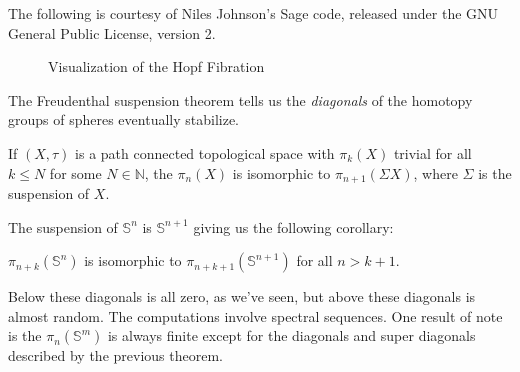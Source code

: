 \documentclass{beamer}
\begin{document}
    \begin{frame}
        The following is courtesy of Niles Johnson's Sage code, released under
        the GNU General Public License, version 2.
        \begin{figure}
            \caption{Visualization of the Hopf Fibration}
            \label{fig:hopf_fibration}
        \end{figure}
    \end{frame}
    \begin{frame}
        The Freudenthal suspension theorem tells us the \textit{diagonals} of
        the homotopy groups of spheres eventually stabilize.
        \begin{theorem}
            If $(X,\tau)$ is a path connected topological space with
            $\pi_{k}(X)$ trivial for all $k\leq{N}$ for some $N\in\mathbb{N}$,
            the $\pi_{n}(X)$ is isomorphic to
            $\pi_{n+1}(\Sigma{X})$, where $\Sigma$ is the suspension of $X$.
        \end{theorem}
        The suspension of $\mathbb{S}^{n}$ is $\mathbb{S}^{n+1}$ giving us the
        following corollary:
        \begin{theorem}
            $\pi_{n+k}(\mathbb{S}^{n})$ is isomorphic to
            $\pi_{n+k+1}(\mathbb{S}^{n+1})$ for all $n>k+1$.
        \end{theorem}
        Below these diagonals is all zero, as we've seen, but above these
        diagonals is almost random. The computations involve spectral sequences.
        One result of note is the $\pi_{n}(\mathbb{S}^{m})$ is always finite
        except for the diagonals and super diagonals described by the
        previous theorem.
    \end{frame}
\end{document}
